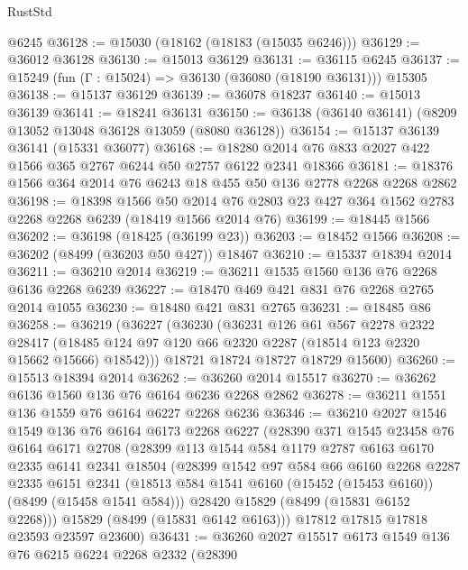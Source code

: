 \begin{lexlean}{RustStd}
\begin{coremodule}
    @6245
@36128 := @15030 (@18162 (@18183 (@15035 @6246)))
@36129 := @36012 @36128
@36130 := @15013 @36129
@36131 := @36115 @6245
@36137 := @15249 (fun (Γ : @15024) => @36130 (@36080 (@18190 @36131))) @15305
@36138 := @15137 @36129
@36139 := @36078 @18237
@36140 := @15013 @36139
@36141 := @18241 @36131
@36150 := @36138 (@36140 @36141) (@8209 @13052 @13048 @36128 @13059 (@8080 @36128))
@36154 := @15137 @36139 @36141 (@15331 @36077)
@36168 := @18280 @2014 @76 @833 @2027 @422 @1566 @365 @2767 @6244 @50 @2757 @6122 @2341 @18366
@36181 := @18376 @1566 @364 @2014 @76 @6243 @18 @455 @50 @136 @2778 @2268 @2268 @2862
@36198 := @18398
    @1566
    @50
    @2014
    @76
    @2803
    @23
    @427
    @364
    @1562
    @2783
    @2268
    @2268
    @6239
    (@18419 @1566 @2014 @76)
@36199 := @18445 @1566
@36202 := @36198 (@18425 (@36199 @23))
@36203 := @18452 @1566
@36208 := @36202 (@8499 (@36203 @50 @427)) @18467
@36210 := @15337 @18394 @2014
@36211 := @36210 @2014
@36219 := @36211 @1535 @1560 @136 @76 @2268 @6136 @2268 @6239
@36227 := @18470 @469 @421 @831 @76 @2268 @2765 @2014 @1055
@36230 := @18480 @421 @831 @2765
@36231 := @18485 @86
@36258 := @36219
    (@36227
      (@36230
        (@36231
          @126
          @61
          @567
          @2278
          @2322
          @28417
          (@18485 @124 @97 @120 @66 @2320 @2287 (@18514 @123 @2320 @15662 @15666) @18542)))
      @18721
      @18724
      @18727
      @18729
      @15600)
@36260 := @15513 @18394 @2014
@36262 := @36260 @2014 @15517
@36270 := @36262 @6136 @1560 @136 @76 @6164 @6236 @2268 @2862
@36278 := @36211 @1551 @136 @1559 @76 @6164 @6227 @2268 @6236
@36346 := @36210
    @2027
    @1546
    @1549
    @136
    @76
    @6164
    @6173
    @2268
    @6227
    (@28390
      @371
      @1545
      @23458
      @76
      @6164
      @6171
      @2708
      (@28399
        @113
        @1544
        @584
        @1179
        @2787
        @6163
        @6170
        @2335
        @6141
        @2341
        @18504
        (@28399
          @1542
          @97
          @584
          @66
          @6160
          @2268
          @2287
          @2335
          @6151
          @2341
          (@18513 @584 @1541 @6160 (@15452 (@15453 @6160)) (@8499 (@15458 @1541 @584)))
          @28420
          @15829
          (@8499 (@15831 @6152 @2268)))
        @15829
        (@8499 (@15831 @6142 @6163)))
      @17812
      @17815
      @17818
      @23593
      @23597
      @23600)
@36431 := @36260
    @2027
    @15517
    @6173
    @1549
    @136
    @76
    @6215
    @6224
    @2268
    @2332
    (@28390

\end{coremodule}
\end{lexlean}
